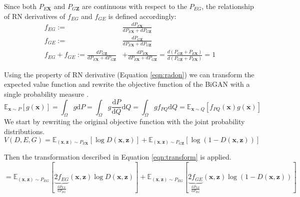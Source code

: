 {Since both $P_{E\mathbf{X}}$ and $P_{G\mathbf{Z}}$ are continuous with respect to the $P_{EG}$, the
relationship of RN derivatives of $f_{EG}$ and $f_{GE}$ is defined accordingly:
\begin{align}
  f_{EG} :=& \frac{ d P_{E\mathbf{X}} }{ d P_{E\mathbf{X}} + d P_{G\mathbf{Z}}} \\[5pt]
  f_{GE} :=& \frac{ d P_{G\mathbf{Z}} }{ d P_{E\mathbf{X}} + d P_{G\mathbf{Z}}} \\[5pt]
  f_{EG} + f_{GE} :=   \frac{ d P_{G\mathbf{Z}} }{ d P_{E\mathbf{X}} + d P_{G\mathbf{Z}}} &+ \frac{ d P_{E\mathbf{X}} }{ d P_{E\mathbf{X}} + d P_{G\mathbf{Z}}} = \frac{ d( P_{G\mathbf{Z}} + P_{E\mathbf{X}}) }{ d( P_{G\mathbf{Z}} + P_{E\mathbf{X}} ) } = 1 
\end{align}

Using the property of RN derivative (Equation \ref{eqn:radon}) we can transform the expected value
function and rewrite the objective function of the BiGAN with a single probability
measure \cite{Donahue2017AdversarialFL} \cite{Goodfellow:2014:GAN:2969033.2969125}.
\begin{equation}
    \label{eqn:transform}
    \mathbb{E}_{\mathbf{x} \sim P}[g(\mathbf{x})]=\int_{\Omega} g \mathrm{d} P=\int_{\Omega} g \frac{\mathrm{d} P}{\mathrm{d} Q} \mathrm{d} Q=\int_{\Omega} g f_{P Q} \mathrm{d} Q=\mathbb{E}_{\mathbf{x} \sim Q}\left[f_{P Q}(\mathbf{x}) g(\mathbf{x})\right]
\end{equation}
We start by rewriting the original objective function with the joint probability distributions.
\begin{equation}
    V(D, E, G) = \mathbb{E}_{(\mathbf{x}, \mathbf{z}) \sim P_{E \mathbf{X}}}[\log D(\mathbf{x}, \mathbf{z})]+\mathbb{E}_{(\mathbf{x}, \mathbf{z}) \sim P_{G \mathbf{Z}}}[\log (1-D(\mathbf{x}, \mathbf{z}))] 
\end{equation}

Then the transformation described in Equation \ref{eqn:transform} is applied.
\begin{equation}
    =\mathbb{E}_{(\mathbf{x}, \mathbf{z}) \sim P_{E G}}  [ \underbrace{2 f_{E G}}_{\frac{\mathrm{d} P_{E X}}{\mathrm{d} P_{E G}}}(\mathbf{x}, \mathbf{z}) \log D(\mathbf{x}, \mathbf{z})] +\mathbb{E}_{(\mathbf{x}, \mathbf{z}) \sim P_{E G}}[\underbrace{2 f_{G E}}_{\frac{\mathrm{d} P_{G Z}}{\mathrm{d} P_{E G}}}(\mathbf{x}, \mathbf{z}) \log (1-D(\mathbf{x}, \mathbf{z}))]
\end{equation}

}
